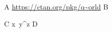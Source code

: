 \documentclass{article}
\makeatletter
\newcommand\vfont[1]{{\verbatim@font #1}}
\makeatother
\begin{document}
A \url{https://ctan.org/pkg/q~orld} B

C \vfont{x\string~y\string^z} D
\end{document}
